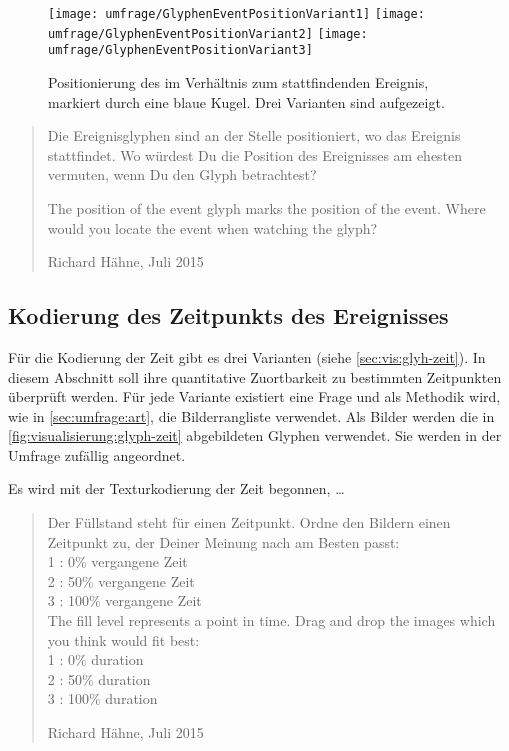 \begin{figure}
	\texttt{[image: umfrage/GlyphenEventPositionVariant1]}
	\hspace*{.1\textwidth}%
	\texttt{[image: umfrage/GlyphenEventPositionVariant2]}
	\hspace*{.1\textwidth}%
	\texttt{[image: umfrage/GlyphenEventPositionVariant3]}
	{\caption{Positionierung des  im Verhältnis zum stattfindenden Ereignis, markiert durch eine blaue Kugel. Drei Varianten sind aufgezeigt.}\label{fig:visualisierung:glyph-position}}
\end{figure}

\blockquote[Richard Hähne, Juli 2015]{
	Die Ereignisglyphen sind an der Stelle positioniert, wo das Ereignis stattfindet. Wo würdest Du die Position des Ereignisses am ehesten vermuten, wenn Du den Glyph betrachtest?
	
	The position of the event glyph marks the position of the event. Where would you locate the event when watching the glyph?
}

\subsection*{Kodierung des Zeitpunkts des Ereignisses}
Für die Kodierung der Zeit gibt es drei Varianten (siehe \autoref{sec:vis:glyh-zeit}). In diesem Abschnitt soll ihre quantitative Zuortbarkeit zu bestimmten Zeitpunkten überprüft werden. Für jede Variante existiert eine Frage und als Methodik wird, wie in \autoref{sec:umfrage:art}, die Bilderrangliste verwendet. Als Bilder werden die in \autoref{fig:visualisierung:glyph-zeit} abgebildeten Glyphen verwendet. Sie werden in der Umfrage zufällig angeordnet.

Es wird mit der Texturkodierung der Zeit begonnen, \ldots
\blockquote[Richard Hähne, Juli 2015]{
Der Füllstand steht für einen Zeitpunkt. Ordne den Bildern einen Zeitpunkt zu, der Deiner Meinung nach am Besten passt:\\
1 : 0\% vergangene Zeit\\
2 : 50\% vergangene Zeit\\
3 : 100\% vergangene Zeit\\

The fill level represents a point in time. Drag and drop the images which you think would fit best:\\
1 : 0\% duration\\
2 : 50\% duration\\
3 : 100\% duration\\
}

